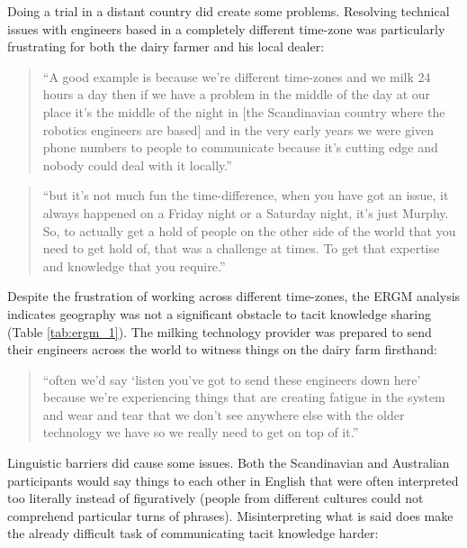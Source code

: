 Doing a trial in a distant country did create some problems. Resolving technical issues with engineers based in a completely different time-zone was particularly frustrating for both the dairy farmer and his local dealer:

\begin{quote}
\small
\enquote{A good example is because we're different time-zones and we milk 24 hours a day then if we have a problem in the middle of the day at our place it's the middle of the night in [the Scandinavian country where the robotics engineers are based] and in the very early years we were given phone numbers to people to communicate because it's cutting edge and nobody could deal with it locally.} \\
\end{quote}

\begin{quote}
\small
\enquote{but it's not much fun the time-difference, when you have got an issue, it always happened on a Friday night or a Saturday night, it's just Murphy. So, to actually get a hold of people on the other side of the world that you need to get hold of, that was a challenge at times. To get that expertise and knowledge that you require.} \\
\end{quote}

Despite the frustration of working across different time-zones, the ERGM analysis indicates geography was not a significant obstacle to tacit knowledge sharing (Table \ref{tab:ergm_1}). The milking technology provider was prepared to send their engineers across the world to witness things on the dairy farm firsthand:

\begin{quote}
\small
\enquote{often we'd say \enquote{listen you've got to send these engineers down here} because we're experiencing things that are creating fatigue in the system and wear and tear that we don't see anywhere else with the older technology we have so we really need to get on top of it.} \\
\end{quote}

Linguistic barriers did cause some issues. Both the Scandinavian and Australian participants would say things to each other in English that were often interpreted too literally instead of figuratively (people from different cultures could not comprehend particular turns of phrases). Misinterpreting what is said does make the already difficult task of communicating tacit knowledge harder:

